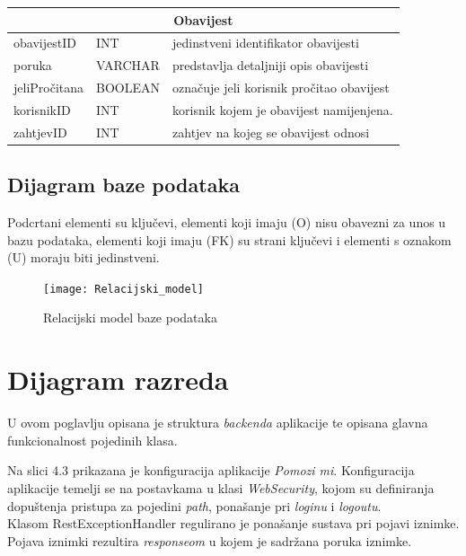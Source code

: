 			\begin{tabularx}{\textwidth} {|p{2.4cm}|p{2cm}|X|}
				\hline
				\multicolumn{3}{|c|}{\textbf{Obavijest}} \\
				\hline
				\cellcolor{LightGreen} obavijestID & INT & jedinstveni identifikator obavijesti \\
				\hline
				poruka & VARCHAR & predstavlja detaljniji opis obavijesti \\
				\hline
				jeliPročitana & BOOLEAN & označuje jeli korisnik pročitao obavijest \\
				\hline
				\cellcolor{LightBlue}
				korisnikID & INT & korisnik kojem je obavijest namijenjena. \\
				\hline
				\cellcolor{LightBlue}
				zahtjevID & INT & zahtjev na kojeg se obavijest odnosi \\
				\hline
			\end{tabularx}
			
			
			
			\newpage
			\subsection{Dijagram baze podataka}
			Podcrtani elementi su ključevi, elementi koji imaju (O) nisu obavezni za unos u bazu podataka, elementi koji imaju (FK) su strani ključevi i elementi s oznakom (U) moraju biti jedinstveni.
			
			\begin{figure}[h]
				\texttt{[image: Relacijski\_model]}
				\caption{Relacijski model baze podataka}
			\end{figure}
			
			\eject
			


			
			
		\section{Dijagram razreda}
		
			U ovom poglavlju opisana je struktura \textit{backenda} aplikacije te opisana glavna funkcionalnost pojedinih klasa.\newline
			\newline
		
		
		
				Na slici 4.3 prikazana je konfiguracija aplikacije \textit{Pomozi mi}. Konfiguracija aplikacije temelji se na postavkama u klasi \textit{WebSecurity}, kojom su definiranja dopuštenja pristupa za pojedini \textit{path}, ponašanje pri \textit{loginu} i \textit{logoutu}. \\
				Klasom RestExceptionHandler regulirano je ponašanje sustava pri pojavi iznimke. Pojava iznimki rezultira \textit{responseom} u kojem je sadržana poruka iznimke.
				
